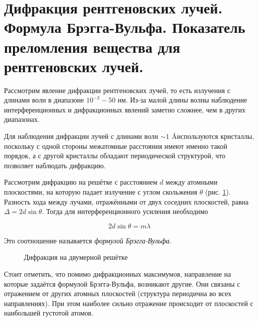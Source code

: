 \section{Дифракция рентгеновских лучей. Формула Брэгга-Вульфа. Показатель преломления вещества для
рентгеновских лучей.}

Рассмотрим явление дифракции рентгеновских лучей, то есть излучения с длинами волн в диапазоне $10^{-3} - 50$ нм. Из-за малой длины волны наблюдение интерференционных и дифракционных явлений заметно сложнее, чем в других диапазонах.

Для наблюдения дифракции лучей с длинами волн $\sim 1$ \AA используются кристаллы, поскольку с одной стороны межатомные расстояния имеют именно такой порядок, а с другой кристаллы обладают периодической структурой, что позволяет наблюдать дифракцию.

Рассмотрим дифракцию на решётке с расстоянием $d$ между атомными плоскостями, на которую падает излучение с углом скольжения $\theta$ (рис. \ref{fig:формула-Брэгга-Вульфа}). Разность хода между лучами, отражёнными от двух соседних плоскостей, равна $\Delta = 2 d \sin \theta$. Тогда для интерференционного усиления необходимо

\begin{equation}
    2 d \sin \theta = m \lambda
\end{equation}

\noindent
Это соотношение называется \textit{формулой Брэгга-Вульфа}.

\begin{figure}[htbp]
    \centering
    \def\svgwidth{0.4\linewidth}
    
    \caption{Дифракция на двумерной решётке}
    \label{fig:формула-Брэгга-Вульфа}
\end{figure}

Стоит отметить, что помимо дифракционных максимумов, направление на которые задаётся формулой Брэгга-Вульфа, возникают другие. Они связаны с отражением от других атомных плоскостей (структура периодична во всех направлениях). При этом наиболее сильно отражение происходит от плоскостей с наибольшей густотой атомов.
